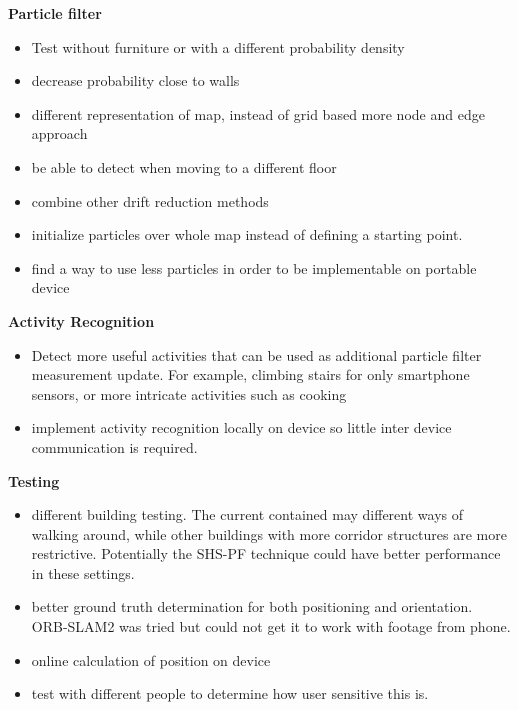 \textbf{Particle filter}
\begin{itemize}
	\item Test without furniture or with a different probability density
	\item decrease probability close to walls
	\item different representation of map, instead of grid based more node and edge approach 
	\item be able to detect when moving to a different floor
	\item combine other drift reduction methods
	\item initialize particles over whole map instead of defining a starting point.
	\item find a way to use less particles in order to be implementable on portable device
\end{itemize}

\textbf{Activity Recognition}
\begin{itemize}
	\item Detect more useful activities that can be used as additional particle filter measurement update. For example, climbing stairs for only smartphone sensors, or more intricate activities such as cooking
	\item implement activity recognition locally on device so little inter device communication is required.
\end{itemize}


\textbf{Testing}
\begin{itemize}
	\item different building testing. The current contained may different ways of walking around, while other buildings with more corridor structures are more restrictive. Potentially the SHS-PF technique could have better performance in these settings.
	\item better ground truth determination for both positioning and orientation. ORB-SLAM2 was tried but could not get it to work with footage from phone.
	\item online calculation of position on device
	\item test with different people to determine how user sensitive this is.
\end{itemize}
